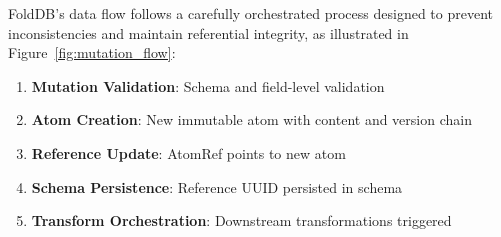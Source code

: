 \documentclass[11pt,a4paper]{article}
\begin{document}
FoldDB's data flow follows a carefully orchestrated process designed to prevent inconsistencies and maintain referential integrity, as illustrated in Figure~\ref{fig:mutation_flow}:

\begin{enumerate}
\item \textbf{Mutation Validation}: Schema and field-level validation
\item \textbf{Atom Creation}: New immutable atom with content and version chain
\item \textbf{Reference Update}: AtomRef points to new atom
\item \textbf{Schema Persistence}: Reference UUID persisted in schema
\item \textbf{Transform Orchestration}: Downstream transformations triggered
\end{enumerate}
\end{document}
